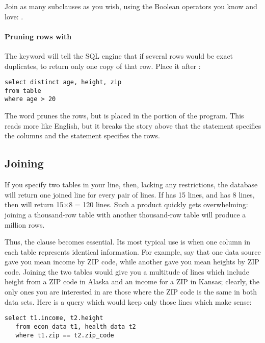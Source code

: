 Join as many subclauses as you wish, using the Boolean operators you
know and love: .


\paragraph{Pruning rows with } The 
keyword will tell the SQL engine that if several rows would be exact
duplicates, to return only one copy of that row. Place it after 
: 
\begin{lstlisting}
select distinct age, height, zip
from table
where age > 20
\end{lstlisting}
The   word prunes the rows, but is placed in the 
 portion of the program.  This reads more like English, but it
breaks the story above that the  statement specifies the
columns and the  statement specifies the rows.

\subsection{Joining}
If you specify two tables in your  line, then, lacking any
restrictions, the database will return one joined line for every pair of lines.
If  has 15 lines, and  has 8 lines, then  will return 15$\times$8 = 120 lines.  Such a product
quickly gets overwhelming: joining a thousand-row table with another
thousand-row table will produce a million rows.

Thus, the  clause becomes essential. Its most typical use is
when one column in each table represents identical information. For
example, say that one data source gave you mean income by ZIP code,
while another gave you mean heights by ZIP code. Joining the two tables
would give you a multitude of lines which include height from a ZIP code
in Alaska and an income for a ZIP in Kansas; clearly, the only ones you
are interested in are those where the ZIP code is the same in both data
sets. Here is a query which would keep only those lines which make
sense:

\begin{lstlisting}
select t1.income, t2.height
   from econ_data t1, health_data t2
   where t1.zip == t2.zip_code
\end{lstlisting}

